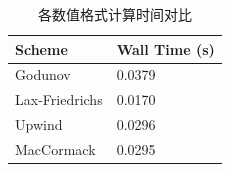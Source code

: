 \begin{table}
\caption{各数值格式计算时间对比}
\label{tab:timing}
\begin{tabular}{ll}
\toprule
Scheme & Wall Time (s) \\
\midrule
Godunov & 0.0379 \\
Lax-Friedrichs & 0.0170 \\
Upwind & 0.0296 \\
MacCormack & 0.0295 \\
\bottomrule
\end{tabular}
\end{table}
